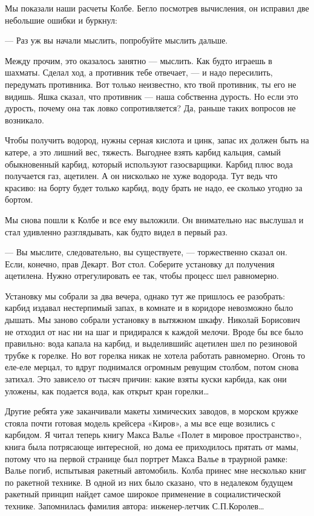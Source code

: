 Мы показали наши  расчеты Колбе. Бегло  посмотрев вычисления, он  исправил
две небольшие ошибки и буркнул:

— Раз уж вы начали мыслить, попробуйте мыслить дальше.

Между прочим,  это  оказалось  занятно  — мыслить.  Как  будто  играешь  в
шахматы. Сделал  ход, а  противник  тебе отвечает,  — и  надо  пересилить,
передумать противника. Вот только неизвестно,  кто твой противник, ты  его
не видишь. Яшка сказал, что противник  — наша собственна дурость. Но  если
это дурость,  почему  она  так  ловко  сопротивляется?  Да,  раньше  таких
вопросов не возникало.

Чтобы получить водород, нужны серная кислота и цинк, запас их должен  быть
на катере, а это лишний вес, тяжесть. Выгоднее взять карбид кальция, самый
обыкновенный карбид,  который используют  газосварщики. Карбид  плюс  вода
получается газ, ацетилен. А  он нисколько не хуже  водорода. Тут ведь  что
красиво: на борту  будет только  карбид, воду  брать не  надо, ее  сколько
угодно за бортом.

Мы снова пошли к Колбе и все  ему выложили. Он внимательно нас выслушал  и
стал удивленно разглядывать, как будто видел в первый раз.

— Вы мыслите,  следовательно, вы  существуете, —  торжественно сказал  он.
Если, конечно,  прав Декарт.  Вот стол.  Соберите установку  дл  получения
ацетилена. Нужно отрегулировать ее так, чтобы процесс шел равномерно.

Установку мы собрали за два вечера,  однако тут же пришлось ее  разобрать:
карбид издавал нестерпимый запах, в  комнате и в коридоре невозможно  было
дышать. Мы заново собрали установку в вытяжном шкафу. Николай Борисович не
отходил от нас ни на шаг и  придирался к каждой мелочи. Вроде бы все  было
правильно: вода капала на карбид, и выделившийс ацетилен шел по  резиновой
трубке к  горелке. Но  вот горелка  никак не  хотела работать  равномерно.
Огонь то еле-еле  мерцал, то  вдруг поднимался  огромным ревущим  столбом,
потом снова  затихал. Это  зависело  от тысяч  причин: какие  взяты  куски
карбида, как они уложены, как подается вода, как открыт кран горелки…

Другие ребята уже заканчивали макеты химических заводов, в морском  кружке
стояла почти готовая  модель крейсера  «Киров», а  мы все  еще возились  с
карбидом. Я читал теперь книгу Макса Валье «Полет в мировое пространство»,
книга была потрясающе интересной, но дома ее приходилось прятать от  мамы,
потому что на первой  странице был портрет Макса  Валье в траурной  рамке:
Валье погиб,  испытывая ракетный  автомобиль. Колба  принес мне  несколько
книг по ракетной  технике. В одной  из них было  сказано, что в  недалеком
будущем   ракетный   принцип   найдет    самое   широкое   применение    в
социалистической  технике.  Запомнилась  фамилия  автора:   инженер-летчик
С.П.Королев…

